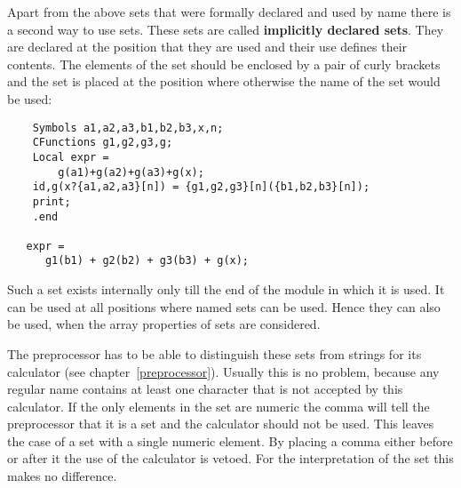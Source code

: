 Apart from the above sets that were formally declared and used by name 
there is a second way to use sets. These sets are called {\bf implicitly 
declared sets}. They are declared at the 
position that they are used and their use defines their contents. The 
elements of the set should be enclosed by a pair of curly 
brackets and the set is placed at the position where 
otherwise the name of the set would be used:
\begin{verbatim}
    Symbols a1,a2,a3,b1,b2,b3,x,n;
    CFunctions g1,g2,g3,g;
    Local expr =
        g(a1)+g(a2)+g(a3)+g(x);
    id,g(x?{a1,a2,a3}[n]) = {g1,g2,g3}[n]({b1,b2,b3}[n]);
    print;
    .end

   expr =
      g1(b1) + g2(b2) + g3(b3) + g(x);
\end{verbatim}
Such a set exists internally only till the end of the module in which it 
is used. It can be used at all positions where named sets can be used. 
Hence they can also be used, when the array properties of sets are 
considered.

The preprocessor has to be able to distinguish these sets from strings for 
its calculator (see 
chapter~\ref{preprocessor}). Usually this is no problem, because any 
regular name contains at least one character that is not accepted by this 
calculator. If the only elements in the set are numeric the 
comma will tell the preprocessor that it is a set and the 
calculator should not be used. This leaves the case of a set with a single 
numeric element. By placing a comma either before or after it the use of 
the calculator is vetoed. For the interpretation of the set this makes no 
difference.


